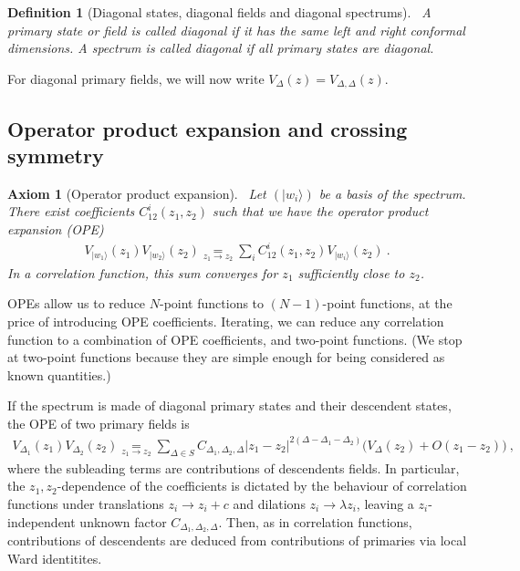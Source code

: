 \documentclass[12pt, a4paper]{article}
\theoremstyle{break}
\newtheorem{hyp}[exo]{Axiom}
\newtheorem{defn}[exo]{Definition}
\begin{document}
\begin{defn}[Diagonal states, diagonal fields and diagonal spectrums]
 ~\label{def:diag}
 A primary state or field is called diagonal if it has the same left and right conformal dimensions. A spectrum is called diagonal if all primary states are diagonal.
\end{defn}
For diagonal primary fields, we will now write  $V_\Delta(z) = V_{\Delta,\Delta}(z)$.


\subsection{Operator product expansion and crossing symmetry}

\begin{hyp}[Operator product expansion]
 ~\label{hyp:ope}
 Let $(|w_i\rangle)$ be a basis of the spectrum.
 There exist coefficients $C^i_{12}(z_1,z_2)$ such that we have the operator product expansion (OPE) 
 \begin{align}
  V_{|w_1\rangle}(z_1)V_{|w_2\rangle}(z_2) \underset{z_1\to z_2}{=} \sum_i C^i_{12}(z_1,z_2) V_{|w_i\rangle}(z_2)\ .
 \end{align}
 In a correlation function,
 this sum converges for $z_1$ sufficiently close to $z_2$.
\end{hyp}
OPEs allow us to reduce $N$-point functions to $(N-1)$-point functions, at the price of introducing OPE coefficients. 
Iterating, we can reduce any correlation function to a combination of OPE coefficients, and two-point functions. (We stop at two-point functions because they are simple enough for being considered as known quantities.) 

If
the spectrum is made of diagonal primary states and their descendent states, the OPE of two primary fields is
\begin{align}
 V_{\Delta_1}(z_1) V_{\Delta_2}(z_2) 
\underset{z_1\to z_2}{=} \sum_{\Delta\in S} C_{\Delta_1,\Delta_2,\Delta} |z_1-z_2|^{2(\Delta-\Delta_1-\Delta_2)}
 \Big(V_{\Delta}(z_2) + O(z_1-z_2) \Big)\ ,
 \label{eq:ope}
\end{align}
where the subleading terms are contributions of descendents fields. 
In particular, the $z_1,z_2$-dependence of the coefficients is dictated by the behaviour
of correlation functions under translations $z_i\to z_i+c$ and dilations $z_i\to\lambda z_i$, leaving a $z_i$-independent unknown factor $C_{\Delta_1,\Delta_2,\Delta}$.
Then, as in correlation functions, contributions of descendents are deduced from contributions of primaries via local Ward identitites.
\end{document}
